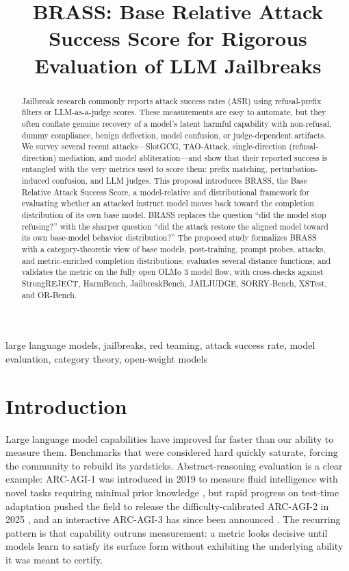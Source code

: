\documentclass[conference]{IEEEtran}
\title{BRASS: Base Relative Attack Success Score for Rigorous Evaluation of LLM Jailbreaks}
\author{\IEEEauthorblockN{Author Name}
\IEEEauthorblockA{Affiliation\\
Email}}
\begin{document}
\maketitle

\begin{abstract}
Jailbreak research commonly reports attack success rates (ASR) using refusal-prefix filters or LLM-as-a-judge scores. These measurements are easy to automate, but they often conflate genuine recovery of a model's latent harmful capability with non-refusal, dummy compliance, benign deflection, model confusion, or judge-dependent artifacts. We survey several recent attacks---SlotGCG, TAO-Attack, single-direction (refusal-direction) mediation, and model abliteration---and show that their reported success is entangled with the very metrics used to score them: prefix matching, perturbation-induced confusion, and LLM judges. This proposal introduces BRASS, the Base Relative Attack Success Score, a model-relative and distributional framework for evaluating whether an attacked instruct model moves back toward the completion distribution of its own base model. BRASS replaces the question ``did the model stop refusing?'' with the sharper question ``did the attack restore the aligned model toward its own base-model behavior distribution?'' The proposed study formalizes BRASS with a category-theoretic view of base models, post-training, prompt probes, attacks, and metric-enriched completion distributions; evaluates several distance functions; and validates the metric on the fully open OLMo 3 model flow, with cross-checks against StrongREJECT, HarmBench, JailbreakBench, JAILJUDGE, SORRY-Bench, XSTest, and OR-Bench.
\end{abstract}

\begin{IEEEkeywords}
large language models, jailbreaks, red teaming, attack success rate, model evaluation, category theory, open-weight models
\end{IEEEkeywords}

\section{Introduction}

Large language model capabilities have improved far faster than our ability to measure them. Benchmarks that were considered hard quickly saturate, forcing the community to rebuild its yardsticks. Abstract-reasoning evaluation is a clear example: ARC-AGI-1 was introduced in 2019 to measure fluid intelligence with novel tasks requiring minimal prior knowledge \cite{chollet2019measure}, but rapid progress on test-time adaptation pushed the field to release the difficulty-calibrated ARC-AGI-2 in 2025 \cite{chollet2025arcagi2}, and an interactive ARC-AGI-3 has since been announced \cite{arcprize2025}. The recurring pattern is that capability outruns measurement: a metric looks decisive until models learn to satisfy its surface form without exhibiting the underlying ability it was meant to certify.
\end{document}
